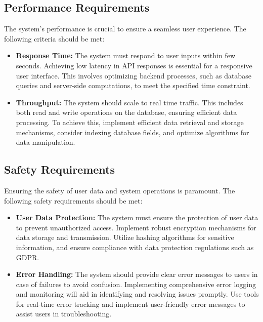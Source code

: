 \documentclass{article}
\begin{document}
\vspace{1em}  %

\subsection{Performance Requirements}
The system's performance is crucial to ensure a seamless user experience. The following criteria should be met:

\vspace{1em}  %

\begin{itemize}
    \item \textbf{Response Time:} The system must respond to user inputs within few seconds. Achieving low latency in API responses is essential for a responsive user interface. This involves optimizing backend processes, such as database queries and server-side computations, to meet the specified time constraint.

    \item \textbf{Throughput:} The system should scale to real time traffic. This includes both read and write operations on the database, ensuring efficient data processing. To achieve this, implement efficient data retrieval and storage mechanisms, consider indexing database fields, and optimize algorithms for data manipulation.
\end{itemize}

\vspace{1em}  %

\subsection{Safety Requirements}
Ensuring the safety of user data and system operations is paramount. The following safety requirements should be met:

\vspace{1em}  %

\begin{itemize}
    \item \textbf{User Data Protection:} The system must ensure the protection of user data to prevent unauthorized access. Implement robust encryption mechanisms for data storage and transmission. Utilize hashing algorithms for sensitive information, and ensure compliance with data protection regulations such as GDPR.

    \item \textbf{Error Handling:} The system should provide clear error messages to users in case of failures to avoid confusion. Implementing comprehensive error logging and monitoring will aid in identifying and resolving issues promptly. Use tools for real-time error tracking and implement user-friendly error messages to assist users in troubleshooting.
\end{itemize}
\end{document}
